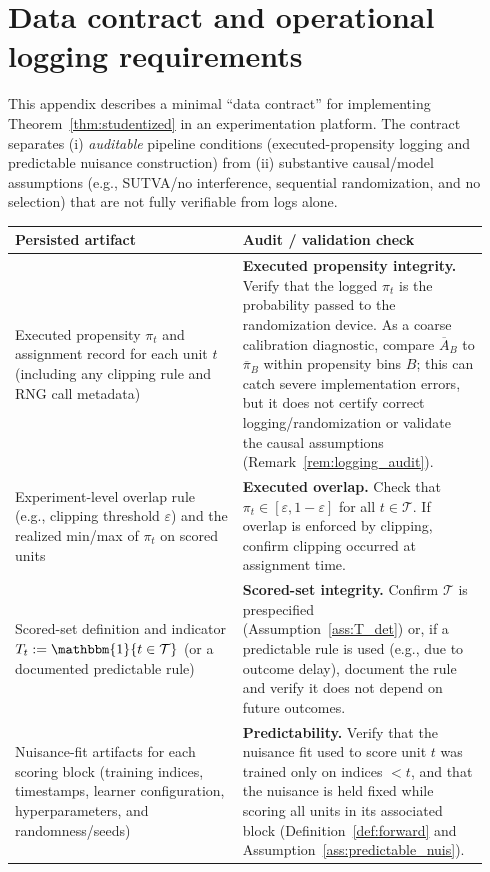 \documentclass[11pt]{article}
\numberwithin{equation}{section}
\theoremstyle{plain}
\theoremstyle{definition}
\theoremstyle{remark}
\newcommand{\ind}[1]{\mathbbm{1}\{#1\}}
\begin{document}
\section{Data contract and operational logging requirements}\label{app:repro}

This appendix describes a minimal ``data contract'' for implementing Theorem~\ref{thm:studentized} in an experimentation platform. The contract separates (i) \emph{auditable} pipeline conditions (executed-propensity logging and predictable nuisance construction) from (ii) substantive causal/model assumptions (e.g., SUTVA/no interference, sequential randomization, and no selection) that are not fully verifiable from logs alone.

\begin{table}[t]
\centering
\small
\begin{tabular}{@{}p{0.46\linewidth} p{0.48\linewidth}@{}}
\toprule
Persisted artifact & Audit / validation check \\
\midrule
Executed propensity $\pi_t$ and assignment record for each unit $t$ (including any clipping rule and RNG call metadata) &
\textbf{Executed propensity integrity.} Verify that the logged $\pi_t$ is the probability passed to the randomization device. As a coarse calibration diagnostic, compare $\overline A_B$ to $\overline\pi_B$ within propensity bins $B$; this can catch severe implementation errors, but it does not certify correct logging/randomization or validate the causal assumptions (Remark~\ref{rem:logging_audit}). \\[0.4em]
Experiment-level overlap rule (e.g., clipping threshold $\varepsilon$) and the realized min/max of $\pi_t$ on scored units &
\textbf{Executed overlap.} Check that $\pi_t\in[\varepsilon,1-\varepsilon]$ for all $t\in\mathcal{T}$. If overlap is enforced by clipping, confirm clipping occurred at assignment time. \\[0.4em]
Scored-set definition and indicator $T_t:=\ind{t\in\mathcal{T}}$ (or a documented predictable rule) &
\textbf{Scored-set integrity.} Confirm $\mathcal{T}$ is prespecified (Assumption~\ref{ass:T_det}) or, if a predictable rule is used (e.g., due to outcome delay), document the rule and verify it does not depend on future outcomes. \\[0.4em]
Nuisance-fit artifacts for each scoring block (training indices, timestamps, learner configuration, hyperparameters, and randomness/seeds) &
\textbf{Predictability.} Verify that the nuisance fit used to score unit $t$ was trained only on indices $<t$, and that the nuisance is held fixed while scoring all units in its associated block (Definition~\ref{def:forward} and Assumption~\ref{ass:predictable_nuis}). \\[0.4em]

\end{tabular}
\end{table}
\end{document}
